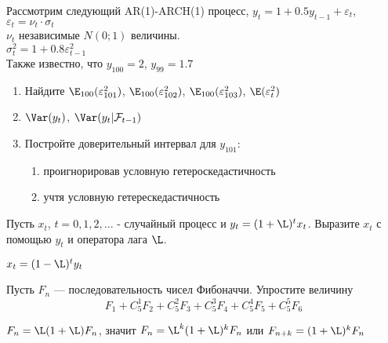 \documentclass[pdftex,11pt,openany]{book}\usepackage[]{graphicx}\usepackage[]{color}
\begin{document}

\begin{problem}
Рассмотрим следующий AR(1)-ARCH(1) процесс, 
$y_{t}=1+0.5y_{t-1}+\varepsilon_{t}$, $\varepsilon_{t}=\nu_{t}\cdot \sigma_{t}$ \\
$\nu_{t}$ независимые $N(0;1)$ величины. \\
$\sigma^{2}_{t}=1+0.8\varepsilon^{2}_{t-1}$\\
Также известно, что $y_{100}=2$, $y_{99}=1.7$ 
\begin{enumerate}
\item Найдите $\E_{100}(\varepsilon^{2}_{101})$, $\E_{100}(\varepsilon^{2}_{102})$, $\E_{100}(\varepsilon^{2}_{103})$, $\E(\varepsilon^{2}_{t})$ 
\item $\Var(y_{t})$, $\Var(y_{t}|\mathcal{F}_{t-1})$ 
\item Постройте доверительный интервал для $y_{101}$:
\begin{enumerate}
\item проигнорировав условную гетероскедастичность 
\item учтя условную гетерескедастичность 
\end{enumerate} 
\end{enumerate} 
\end{problem}

\begin{solution}
\end{solution}



\begin{problem}
Пусть $x_{t}$, $t=0,1,2,...$ - случайный процесс и $y_{t}=(1+\L )^{t}x_{t}$.
Выразите $x_{t}$ с помощью $y_{t}$ и оператора лага $\L $.
\end{problem}

\begin{solution}
$x_{t}=(1-\L )^{t}y_{t}$
\end{solution}


\begin{problem}
Пусть $ F_{n} $ --- последовательность чисел Фибоначчи. Упростите величину
\[ F_{1}+C^{1}_{5}F_{2}+C^{2}_{5}F_{3}+C^{3}_{5}F_{4}+C^{4}_{5}F_{5}+C^{5}_{5}F_{6} \]
\end{problem}

\begin{solution}
$ F_{n}=\L (1+\L )F_{n} $, значит $ F_{n}=\L ^{k}(1+\L )^{k}F_{n} $ или $ F_{n+k}=(1+\L )^{k}F_{n} $
\end{solution}
\end{document}
